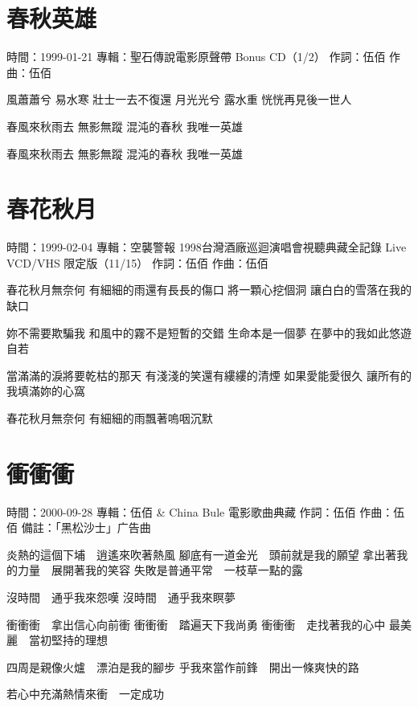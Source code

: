 \documentclass[UTF8,a4paper,oneside,twocolumn,12pt]{ctexbook}
\newcommand{\infopair}[2]{\textbullet #1：#2}
\newcommand{\zc}[1][伍佰]{\infopair{作詞}{#1}}
\newcommand{\zq}[1][伍佰]{\infopair{作曲}{#1}}
\newcommand{\zj}[1]{\infopair{專輯}{#1}}
\newcommand{\sj}[1]{\infopair{時間}{#1}}
\newcommand{\bz}[1]{\infopair{備註}{#1}}
\newenvironment{info}{\begin{flushleft}\kaishu
	}
	{\end{flushleft}\normalsize\yahei\par}
\newenvironment{lyric}{
	}
{}
\begin{document}
\section{春秋英雄}
\begin{info}
	\sj{1999-01-21}
	\zj{聖石傳說電影原聲帶 Bonus CD（1/2）}
	\zc
	\zq
\end{info}
\begin{lyric}
	風蕭蕭兮 易水寒 壯士一去不復還
	月光光兮 露水重 恍恍再見後一世人

	春風來秋雨去 無影無蹤
	混沌的春秋 我唯一英雄

	春風來秋雨去 無影無蹤
	混沌的春秋 我唯一英雄
\end{lyric}

\section{春花秋月}
\begin{info}
	\sj{1999-02-04}
	\zj{空襲警報 1998台灣酒廠巡迴演唱會視聽典藏全記錄 Live VCD/VHS 限定版（11/15）}
	\zc
	\zq
\end{info}
\begin{lyric}%
	春花秋月無奈何
	有細細的雨還有長長的傷口
	將一顆心挖個洞
	讓白白的雪落在我的缺口

	妳不需要欺騙我
	和風中的霧不是短暫的交錯
	生命本是一個夢
	在夢中的我如此悠遊自若

	當滿滿的淚將要乾枯的那天
	有淺淺的笑還有縷縷的清煙
	如果愛能愛很久
	讓所有的我填滿妳的心窩

	春花秋月無奈何
	有細細的雨飄著嗚咽沉默
\end{lyric}

\section{衝衝衝}
\begin{info}
	\sj{2000-09-28}
	\zj{伍佰 \& China Bule 電影歌曲典藏}
	\zc
	\zq
	\bz{「黑松沙士」广告曲}
\end{info}
\begin{lyric}
	炎熱的這個下埔　逍遙來吹著熱風
	腳底有一道金光　頭前就是我的願望
	拿出著我的力量　展開著我的笑容
	失敗是普通平常　一枝草一點的露

	沒時間　通乎我來怨嘆
	沒時間　通乎我來瞑夢

	衝衝衝　拿出信心向前衝
	衝衝衝　踏遍天下我尚勇
	衝衝衝　走找著我的心中
	最美麗　當初堅持的理想

	四周是親像火爐　漂泊是我的腳步
	乎我來當作前鋒　開出一條爽快的路

	若心中充滿熱情來衝　一定成功
\end{lyric}
\end{document}
